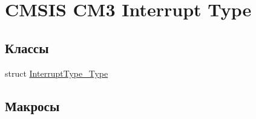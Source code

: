 \hypertarget{group___c_m_s_i_s___c_m3___interrupt_type}{}\section{C\+M\+S\+IS C\+M3 Interrupt Type}
\label{group___c_m_s_i_s___c_m3___interrupt_type}
\subsection*{Классы}
\begin{DoxyCompactItemize}
\item 
struct \mbox{\hyperlink{struct_interrupt_type___type}{Interrupt\+Type\+\_\+\+Type}}
\end{DoxyCompactItemize}
\subsection*{Макросы}
